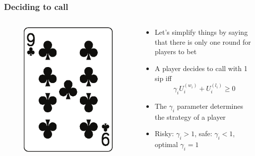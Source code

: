 \documentclass[10pt]{beamer}
\begin{document}
\begin{frame}
\frametitle{Deciding to call}
 \begin{columns}
  \begin{column}{3cm}
   \begin{figure}
    \includegraphics[width=\linewidth]{im/clubs_9.eps}
   \end{figure}
  \end{column}
  
  \begin{column}{7cm}
    \begin{itemize}[label=$\clubsuit$]
     \item Let's simplify things by saying that there is only one round for players to bet
     \item A player decides to call with 1 sip iff
     \[
	\gamma_i U_i^{(w_i)} + U^{(l_i)}_i \geq 0
     \]
     \item The $\gamma_i$ parameter determines the strategy of a player
     \item Risky: $\gamma_i > 1$, safe: $\gamma_i < 1$, optimal $\gamma_i=1$ 
    \end{itemize}
  \end{column}
 \end{columns}
\end{frame}
\end{document}
